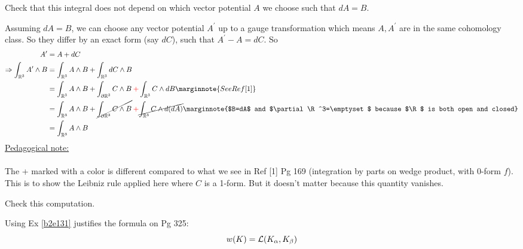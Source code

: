 \documentclass[10pt]{article}
\begin{document}
\begin{example}
	Check that this integral does not depend on which vector potential $A$ we choose such that $dA=B$.
\end{example}
\sol Assuming $dA=B$, we can choose any vector potential $A^\prime$ up to a gauge transformation which means $A,A^\prime$ are in the same cohomology class. So they differ by an exact form (say $dC$), such that $A^\prime-A=dC$. So
$$
\begin{aligned}
	A^\prime&=A+dC\\
	\Rightarrow \int_{\R^3}A^\prime\wedge B &= \int_{\R^3}A\wedge B + \int_{\R^3}dC\wedge B\\
	&=\int_{\R^3}A\wedge B + \int_{\partial\R^3}C\wedge B{\:\color{red}+}\int_{\R^3}C\wedge dB\marginnote{See Ref [1]}\\
	&=\int_{\R^3}A\wedge B + \cancel{\int_{\partial\R^3}C\wedge B}{\:\color{red}+}\cancel{\int_{\R^3}C\wedge d(dA)}\marginnote{$B=dA$ and $\partial\R^3=\emptyset$ because $\R$ is both open and closed}\\
	&= \int_{\R^3}A\wedge B
\end{aligned}
$$
\underline{Pedagogical note:}\\\\
The {\color{red}+} marked with a color is different compared to what we see in Ref [1] Pg 169 (integration by parts on wedge product, with 0-form $f$). This is to show the Leibniz rule applied here where $C$ is a 1-form. But it doesn't matter because this quantity vanishes.


\begin{example}
	Check this computation.
\end{example}
\sol Using Ex \ref{b2e131} justifies the formula on Pg 325:
$$
w(K)={\mathcal{L}}(K_\alpha,K_\beta)
$$
\end{document}
